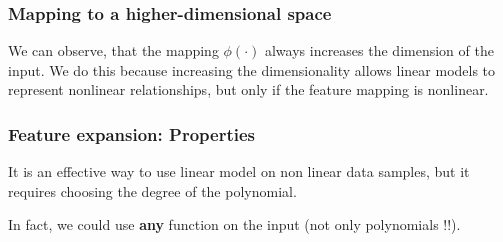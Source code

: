  \subsubsection{Mapping to a higher-dimensional space}
 We can observe, that the mapping $\phi(\cdot)$ always increases the dimension of the input. We do this because increasing the dimensionality allows linear models to represent nonlinear relationships, but only if the feature mapping is nonlinear. 

 \subsubsection{Feature expansion: Properties}
 It is an effective way to use linear model on non linear data samples, but it requires choosing the degree of the polynomial. 
 
 In fact, we could use \textbf{any} function on the input (not only polynomials !!). 
 
